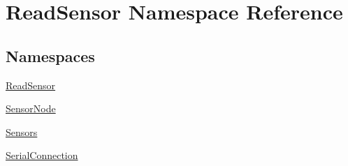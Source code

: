 \hypertarget{namespaceReadSensor}{}\section{Read\+Sensor Namespace Reference}
\label{namespaceReadSensor}
\subsection*{Namespaces}
\begin{DoxyCompactItemize}
\item 
 \hyperlink{namespaceReadSensor_1_1ReadSensor}{Read\+Sensor}
\item 
 \hyperlink{namespaceReadSensor_1_1SensorNode}{Sensor\+Node}
\item 
 \hyperlink{namespaceReadSensor_1_1Sensors}{Sensors}
\item 
 \hyperlink{namespaceReadSensor_1_1SerialConnection}{Serial\+Connection}
\end{DoxyCompactItemize}
